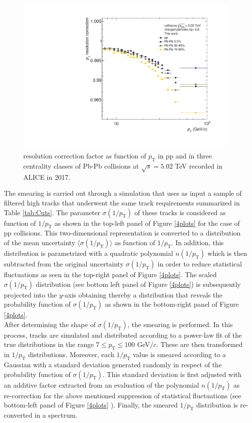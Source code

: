 \documentclass[12pt,a4paper]{report}
\begin{document}
\begin{figure}[tb!]
\centering
\includegraphics[width=12cm]{Plots/ptrescorrppPbPb.pdf}  
\caption{\pt resolution correction factor as function of $p_{\mathrm{T}}$ in pp and in three centrality classes of Pb-Pb collisions at $\sqrt{s} = 5.02$ TeV recorded in ALICE in 2017.}
\label{ptrescorrppPbPb}
\end{figure}
The smearing is carried out through a simulation that uses as input a sample of filtered high \pt tracks that underwent the same track requirements summarized in Table \ref{tab:Cuts}. The parameter $\sigma(1/p_\text{T})$ of these tracks is considered as function of $1/p_\text{T}$ as shown in the top-left panel of Figure \ref{4plots} for the case of pp collisions. This two-dimensional representation is converted to a distribution of the mean uncertainty $\langle\sigma(1/p_\text{T})\rangle$ as function of $1/p_\text{T}$. In addition, this distribution is parametrized with a quadratic polynomial $n(1/p_\text{T})$ which is then subtracted from the original uncertainty $\sigma(1/p_\text{T})$ in order to reduce statistical fluctuations as seen in the top-right panel of Figure \ref{4plots}. The scaled $\sigma(1/p_\text{T})$ distribution (see bottom left panel of Figure \ref{4plots}) is subsequently projected into the $y$-axis obtaining thereby a distribution that reveals the probability function of $\sigma(1/p_\text{T})$ as shown in the bottom-right panel of Figure \ref{4plots}.\\
After determining the shape of $\sigma(1/p_\text{T})$, the smearing is performed. In this process, tracks are simulated and distributed according to a power-law fit of the true \pt distributions in the range $7 \leq p_\text{T} \leq 100$ GeV/$c$. These are then transformed in $1/p_\text{T}$ distributions. Moreover, each $1/p_\text{T}$ value is smeared according to a Gaussian with a standard deviation generated randomly in respect of the probability function of $\sigma(1/p_\text{T})$. This standard deviation is first adjusted with an additive factor extracted from an evaluation of the polynomial $n(1/p_\text{T})$ as re-correction for the above mentioned suppression of statistical fluctuations (see bottom-left panel of Figure \ref{4plots} ). Finally, the smeared $1/p_\text{T}$ distribution is re-converted in a \pt spectrum.\\
\end{document}
